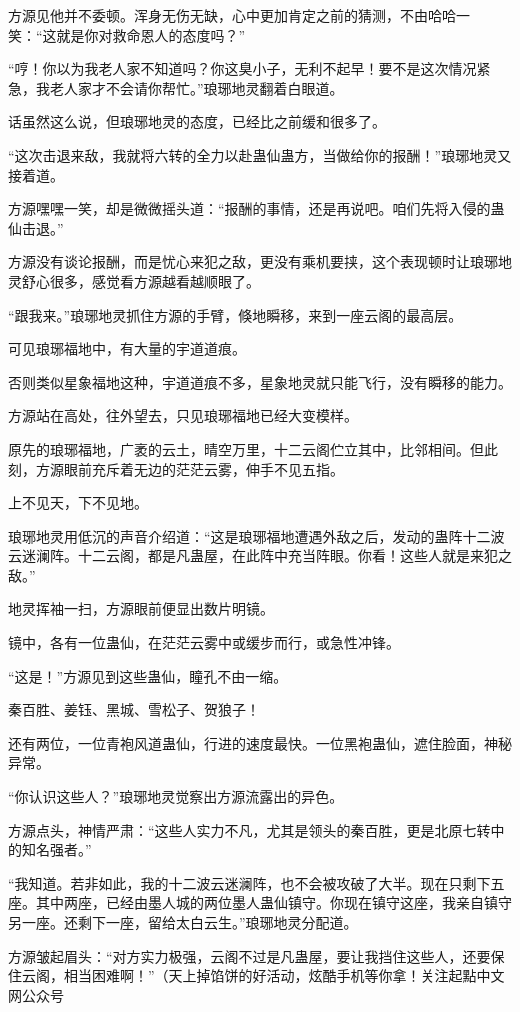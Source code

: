 \begin{this_body}
方源见他并不委顿。浑身无伤无缺，心中更加肯定之前的猜测，不由哈哈一笑：“这就是你对救命恩人的态度吗？”

“哼！你以为我老人家不知道吗？你这臭小子，无利不起早！要不是这次情况紧急，我老人家才不会请你帮忙。”琅琊地灵翻着白眼道。

话虽然这么说，但琅琊地灵的态度，已经比之前缓和很多了。

“这次击退来敌，我就将六转的全力以赴蛊仙蛊方，当做给你的报酬！”琅琊地灵又接着道。

方源嘿嘿一笑，却是微微摇头道：“报酬的事情，还是再说吧。咱们先将入侵的蛊仙击退。”

方源没有谈论报酬，而是忧心来犯之敌，更没有乘机要挟，这个表现顿时让琅琊地灵舒心很多，感觉看方源越看越顺眼了。

“跟我来。”琅琊地灵抓住方源的手臂，倏地瞬移，来到一座云阁的最高层。

可见琅琊福地中，有大量的宇道道痕。

否则类似星象福地这种，宇道道痕不多，星象地灵就只能飞行，没有瞬移的能力。

方源站在高处，往外望去，只见琅琊福地已经大变模样。

原先的琅琊福地，广袤的云土，晴空万里，十二云阁伫立其中，比邻相间。但此刻，方源眼前充斥着无边的茫茫云雾，伸手不见五指。

上不见天，下不见地。

琅琊地灵用低沉的声音介绍道：“这是琅琊福地遭遇外敌之后，发动的蛊阵十二波云迷澜阵。十二云阁，都是凡蛊屋，在此阵中充当阵眼。你看！这些人就是来犯之敌。”

地灵挥袖一扫，方源眼前便显出数片明镜。

镜中，各有一位蛊仙，在茫茫云雾中或缓步而行，或急性冲锋。

“这是！”方源见到这些蛊仙，瞳孔不由一缩。

秦百胜、姜钰、黑城、雪松子、贺狼子！

还有两位，一位青袍风道蛊仙，行进的速度最快。一位黑袍蛊仙，遮住脸面，神秘异常。

“你认识这些人？”琅琊地灵觉察出方源流露出的异色。

方源点头，神情严肃：“这些人实力不凡，尤其是领头的秦百胜，更是北原七转中的知名强者。”

“我知道。若非如此，我的十二波云迷澜阵，也不会被攻破了大半。现在只剩下五座。其中两座，已经由墨人城的两位墨人蛊仙镇守。你现在镇守这座，我亲自镇守另一座。还剩下一座，留给太白云生。”琅琊地灵分配道。

方源皱起眉头：“对方实力极强，云阁不过是凡蛊屋，要让我挡住这些人，还要保住云阁，相当困难啊！”（天上掉馅饼的好活动，炫酷手机等你拿！关注起點中文网公众号

\end{this_body}

